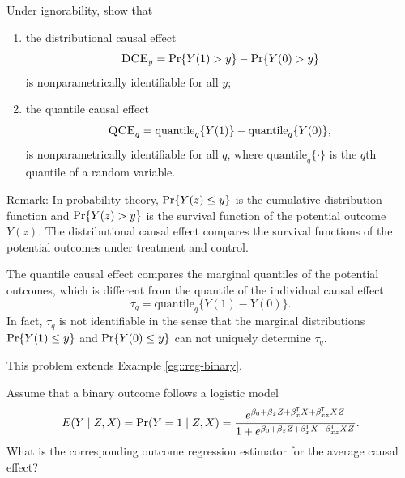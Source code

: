 \begin{HomeworkProblem}\label{exr:10-2}

Under ignorability, show that
\begin{enumerate}
\item
 the distributional causal effect
 \[
\textsc{DCE}_y = \operatorname{Pr}\{  Y(1) > y  \} - \operatorname{Pr}\{ Y(0) > y \}
\]
is nonparametrically identifiable for all $y$;
\item
the quantile causal effect
\[
\textsc{QCE}_q = \text{quantile}_q\{ Y(1) \} - \text{quantile}_q\{ Y(0) \},
\]
is nonparametrically identifiable for all $q$, where $\text{quantile}_q\{ \cdot \} $ is the $q$th quantile of a random variable.
\end{enumerate}



Remark:
In probability theory, $\operatorname{Pr}\{  Y(z) \leq y \}$ is the cumulative distribution function and $\operatorname{Pr}\{  Y(z) > y \}$ is the survival function of the potential outcome $Y(z)$.
The distributional causal effect compares the survival functions of the potential outcomes under treatment and control.

The  quantile causal effect  compares the marginal quantiles of the potential outcomes, which is different from the quantile of the individual causal effect
\[
\tau_q =  \text{quantile}_q\{ Y(1)  - Y(0)\} .
\]
In fact,  $\tau_q$ is not identifiable in the sense that the marginal distributions $\operatorname{Pr}\{  Y(1) \leq  y  \} $ and $ \operatorname{Pr}\{ Y(0) \leq  y \} $ can not uniquely determine $\tau_q$.


\end{HomeworkProblem}

\begin{HomeworkProblem}\label{exr:10-3}

This problem extends Example \ref{eg::reg-binary}.

Assume that a binary outcome follows a logistic model
\[
E(Y\mid Z, X) = \operatorname{Pr}(Y =1\mid Z, X) = \frac{   e^{\beta_0 + \beta_z Z + \beta_x ^{\mkern-1.5mu\mathsf{T}} X + \beta_{xz}  ^{\mkern-1.5mu\mathsf{T}} X Z }  }
{ 1+ e^{\beta_0 + \beta_z Z + \beta_x ^{\mkern-1.5mu\mathsf{T}} X + \beta_{xz}  ^{\mkern-1.5mu\mathsf{T}} X Z} } .
\]
What is the corresponding outcome regression estimator for the average causal effect?

\end{HomeworkProblem}

